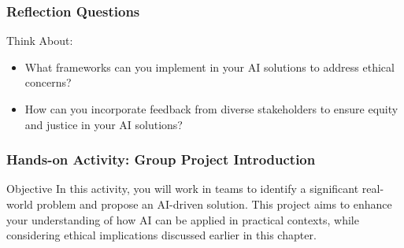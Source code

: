 \documentclass{beamer}
\begin{document}
\begin{frame}[fragile]
    \frametitle{Reflection Questions}
    \begin{block}{Think About:}
        \begin{itemize}
            \item What frameworks can you implement in your AI solutions to address ethical concerns?
            \item How can you incorporate feedback from diverse stakeholders to ensure equity and justice in your AI solutions?
        \end{itemize}
    \end{block}
\end{frame}

\begin{frame}[fragile]
    \frametitle{Hands-on Activity: Group Project Introduction}
    \begin{block}{Objective}
        In this activity, you will work in teams to identify a significant real-world problem and propose an AI-driven solution. This project aims to enhance your understanding of how AI can be applied in practical contexts, while considering ethical implications discussed earlier in this chapter.
    \end{block}
\end{frame}
\end{document}
